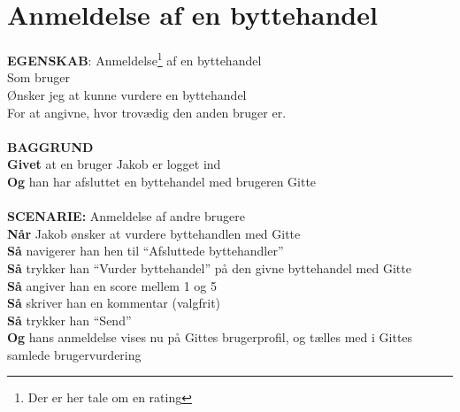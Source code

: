 \section{Anmeldelse af en byttehandel}
{\color{blue}\textbf{EGENSKAB}:} Anmeldelse\footnote{Der er her tale om en rating} af en byttehandel \\
Som bruger \\
Ønsker jeg at kunne vurdere en byttehandel \\
For at angivne, hvor trovædig den anden bruger er.\\ \\
{\color{blue}\textbf{BAGGRUND}} \\
{\color{blue}\textbf{Givet}} at en bruger Jakob er logget ind \\
{\color{blue}\textbf{Og}} han har afsluttet en byttehandel med brugeren Gitte\\\\
{\color{blue}\textbf{SCENARIE:}} Anmeldelse af andre brugere \\
{\color{blue}\textbf{Når}} Jakob ønsker at vurdere byttehandlen med Gitte\\
{\color{blue}\textbf{Så}} navigerer han hen til “Afsluttede byttehandler”\\
{\color{blue}\textbf{Så}} trykker han “Vurder byttehandel” på den givne byttehandel med Gitte\\
{\color{blue}\textbf{Så}} angiver han en score mellem 1 og 5\\
{\color{blue}\textbf{Så}} skriver han en kommentar (valgfrit)\\
{\color{blue}\textbf{Så}} trykker han “Send”\\
{\color{blue}\textbf{Og}} hans anmeldelse vises nu på Gittes brugerprofil, og tælles med i Gittes samlede brugervurdering
